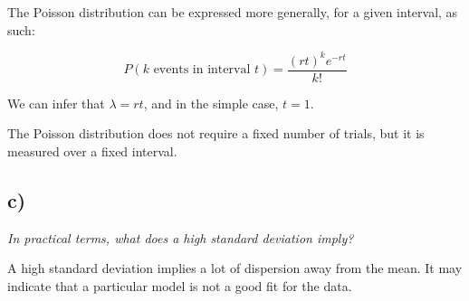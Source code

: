 \documentclass[11pt, oneside]{article}   	%
\begin{document}
The Poisson distribution can be expressed more generally, for a given interval, as such:

$$
P(k \text{ events in interval } t) = \frac{(rt)^ke^{-rt}}{k!}
$$

We can infer that $\lambda = rt$, and in the simple case, $t=1$.

The Poisson distribution does not require a fixed number of trials, but it is measured over a fixed interval.

\subsection{c)}
\emph{In practical terms, what does a high standard deviation imply?}

A high standard deviation implies a lot of dispersion away from the mean. It may indicate that a particular model is not a good fit for the data. 
\end{document}
